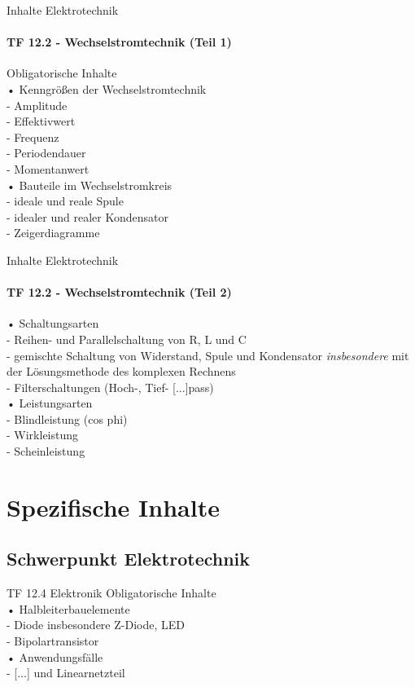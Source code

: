 \documentclass[aspectratio=169, ignorenonframetext]{beamer}
\begin{document}
  \begin{frame}{Inhalte Elektrotechnik}
    \framesubtitle{TF 12.2 - Wechselstromtechnik (Teil 1)}
Obligatorische Inhalte\\
• Kenngrößen der Wechselstromtechnik\\
- Amplitude\\
- Effektivwert\\
- Frequenz\\
- Periodendauer\\
- Momentanwert\\
• Bauteile im Wechselstromkreis\\
- ideale und reale Spule\\
- idealer und realer Kondensator\\
- Zeigerdiagramme\\
\end{frame}

\begin{frame}{Inhalte Elektrotechnik}
    \framesubtitle{TF 12.2 - Wechselstromtechnik (Teil 2)}
• Schaltungsarten\\
- Reihen- und Parallelschaltung von R, L und C\\
- gemischte Schaltung von Widerstand, Spule und Kondensator \emph{insbesondere} mit der Lösungsmethode des komplexen Rechnens\\
- Filterschaltungen (Hoch-, Tief- [...]pass)\\
• Leistungsarten\\
- Blindleistung (cos phi)\\
- Wirkleistung\\
- Scheinleistung\\
  \end{frame}

  \section{Spezifische Inhalte}
  \subsection{Schwerpunkt Elektrotechnik}
  \begin{frame}{TF 12.4 Elektronik}
   Obligatorische Inhalte\\
• Halbleiterbauelemente\\
- Diode insbesondere Z-Diode, LED\\
- Bipolartransistor\\
• Anwendungsfälle\\
- [...] und Linearnetzteil\\
  \end{frame}
\end{document}
